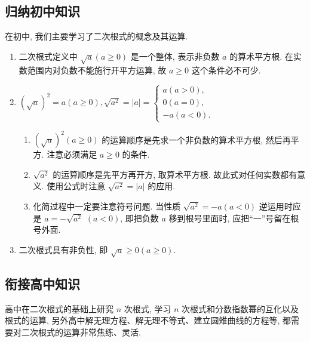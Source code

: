 \subsection{归纳初中知识}
在初中, 我们主要学习了二次根式的概念及其运算.
\begin{enumerate}
	\item 二次根式定义中 $\sqrt{a}(a \geqslant 0)$ 是一个整体, 表示非负数 $a$ 的算术平方根. 在实数范围内对负数不能施行开平方运算, 故 $a \geqslant 0$ 这个条件必不可少.
	\item $(\sqrt{a})^2=a(a \geqslant 0), \sqrt{a^2}=|a|=\left\{\begin{array}{l}a(a>0), \\ 0(a=0), \\ -a(a<0) .\end{array}\right.$
	      \begin{enumerate}
		      \item $(\sqrt{a})^2(a \geqslant 0)$ 的运算顺序是先求一个非负数的算术平方根, 然后再平方. 注意必须满足 $a \geqslant 0$ 的条件.
		      \item $\sqrt{a^2}$ 的运算顺序是先平方再开方, 取算术平方根. 故此式对任何实数都有意义. 使用公式时注意 $\sqrt{a^2}=|a|$ 的应用.
		      \item 化简过程中一定要注意符号问题. 当性质 $\sqrt{a^2}=-a(a<0)$ 逆运用时应是 $a=-\sqrt{a^2}$ $(a<0)$, 即把负数 $a$ 移到根号里面时, 应把“一”号留在根号外面.
	      \end{enumerate}
	\item 二次根式具有非负性, 即 $\sqrt{a} \geqslant 0(a \geqslant 0)$.
\end{enumerate}

\subsection{衔接高中知识}
高中在二次根式的基础上研究 $n$ 次根式, 学习 $n$ 次根式和分数指数幂的互化以及根式的运算, 另外高中解无理方程、解无理不等式、建立圆雉曲线的方程等, 都需要对二次根式的运算非常焦练、灵活.
